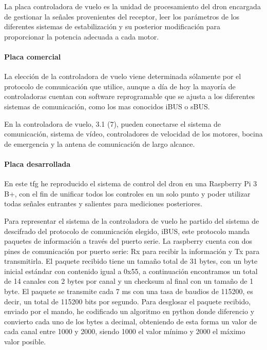	La placa controladora de vuelo es la unidad de procesamiento del dron encargada de gestionar la señales provenientes del receptor, leer los parámetros de los diferentes sistemas de estabilización y su posterior modificación para proporcionar la potencia adecuada a cada motor.
\paragraph{Placa comercial}
\label{SSSS:Placa comercial}
	La elección de la controladora de vuelo viene determinada sólamente por el protocolo de comunicación que utilice, aunque a día de hoy la mayoría de controladoras cuentan con software reprogramable que se ajusta a los diferentes sistemas de comunicación, como los mas conocidos iBUS o sBUS.
	

	En la controladora de vuelo, 3.1 (7), pueden conectarse el sistema de comunicación, sistema de vídeo, controladores de velocidad de los motores, bocina de emergencia y la antena de comunicación de largo alcance.


\paragraph{Placa desarrollada}
\label{SSSS:Placa desarrollada}
	En este \ac{tfg} he reproducido el sistema de control del dron en una Raspberry Pi 3 B+, con el fin de unificar todos los controles en un solo punto y poder utilizar todas señales entrantes y salientes para mediciones posteriores.
	
	Para representar el sistema de la controladora de vuelo he partido del sistema de descifrado del protocolo de comunicación elegido, iBUS, este protocolo manda paquetes de información a través del puerto serie. La raspberry cuenta con dos pines de comunicación por puerto serie: Rx para recibir la información y Tx para transmitirla.
El paquete recibido tiene un tamaño total de 31 bytes, con un byte inicial estándar con contenido igual a 0x55, a continuación encontramos un total de 14 canales con 2 bytes por canal y un checksum al final con un tamaño de 1 byte. El paquete se transmite cada 7 ms con una tasa de baudios de 115200, es decir, un total de 115200 bits por segundo.
Para desglosar el paquete recibido, enviado por el mando, he codificado un algoritmo en python donde diferencio y convierto cada uno de los bytes a decimal, obteniendo de esta forma un valor de cada canal entre 1000 y 2000, siendo 1000 el valor mínimo y 2000 el máximo valor posible.

